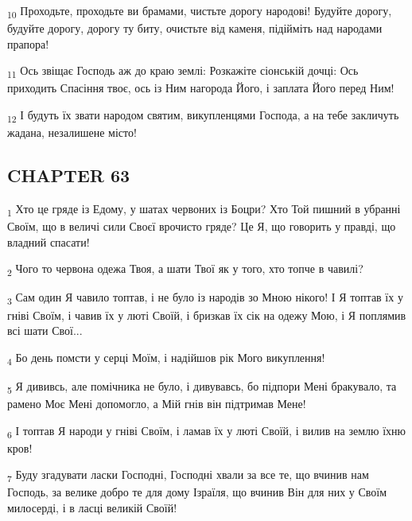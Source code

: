 \begin{tcolorbox}
\textsubscript{10} Проходьте, проходьте ви брамами, чистьте дорогу народові! Будуйте дорогу, будуйте дорогу, дорогу ту биту, очистьте від каменя, підійміть над народами прапора!
\end{tcolorbox}
\begin{tcolorbox}
\textsubscript{11} Ось звіщає Господь аж до краю землі: Розкажіте сіонській дочці: Ось приходить Спасіння твоє, ось із Ним нагорода Його, і заплата Його перед Ним!
\end{tcolorbox}
\begin{tcolorbox}
\textsubscript{12} І будуть їх звати народом святим, викупленцями Господа, а на тебе закличуть жадана, незалишене місто!
\end{tcolorbox}
\subsection{CHAPTER 63}
\begin{tcolorbox}
\textsubscript{1} Хто це гряде із Едому, у шатах червоних із Боцри? Хто Той пишний в убранні Своїм, що в величі сили Своєї врочисто гряде? Це Я, що говорить у правді, що владний спасати!
\end{tcolorbox}
\begin{tcolorbox}
\textsubscript{2} Чого то червона одежа Твоя, а шати Твої як у того, хто топче в чавилі?
\end{tcolorbox}
\begin{tcolorbox}
\textsubscript{3} Сам один Я чавило топтав, і не було із народів зо Мною нікого! І Я топтав їх у гніві Своїм, і чавив їх у люті Своїй, і бризкав їх сік на одежу Мою, і Я поплямив всі шати Свої...
\end{tcolorbox}
\begin{tcolorbox}
\textsubscript{4} Бо день помсти у серці Моїм, і надійшов рік Мого викуплення!
\end{tcolorbox}
\begin{tcolorbox}
\textsubscript{5} Я дививсь, але помічника не було, і дивувавсь, бо підпори Мені бракувало, та рамено Моє Мені допомогло, а Мій гнів він підтримав Мене!
\end{tcolorbox}
\begin{tcolorbox}
\textsubscript{6} І топтав Я народи у гніві Своїм, і ламав їх у люті Своїй, і вилив на землю їхню кров!
\end{tcolorbox}
\begin{tcolorbox}
\textsubscript{7} Буду згадувати ласки Господні, Господні хвали за все те, що вчинив нам Господь, за велике добро те для дому Ізраїля, що вчинив Він для них у Своїм милосерді, і в ласці великій Своїй!
\end{tcolorbox}
